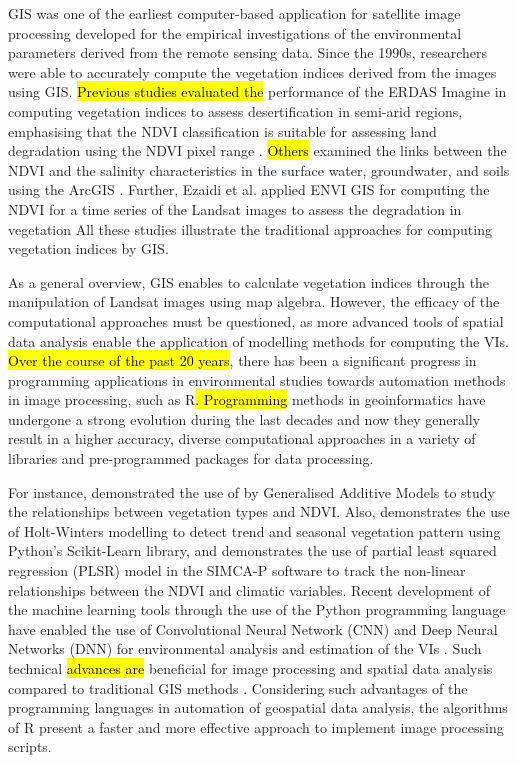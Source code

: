 \documentclass[jimaging,article,submit,pdftex,moreauthors]{Definitions/mdpi}
\begin{document}
GIS was one of the earliest computer-based application for satellite image processing developed for the empirical investigations of the environmental parameters derived from the remote sensing data. Since the 1990s, researchers were able to accurately compute the vegetation indices derived from the images using GIS. \hl{Previous studies evaluated the} performance of the ERDAS Imagine in computing vegetation indices to assess desertification in semi-arid regions, emphasising that the NDVI classification is suitable for assessing land degradation using the NDVI pixel range \cite{KUMAR2022100578}. \hl{Others} examined the links between the NDVI and the salinity characteristics in the surface water, groundwater, and soils using the ArcGIS \cite{RASHID2023100314}. Further, Ezaidi et al. applied ENVI GIS for computing the NDVI for a time series of the Landsat images to assess the degradation in vegetation \cite{EZAIDI2022100800} All these studies illustrate the traditional approaches for computing vegetation indices by GIS.

As a general overview, GIS enables to calculate vegetation indices through the manipulation of Landsat images using map algebra. However, the efficacy of the computational approaches must be questioned, as more advanced tools of spatial data analysis enable the application of modelling methods for computing the VIs. \hl{Over the course of the past 20 years}, there has been a significant progress in programming applications in environmental studies towards automation methods in image processing, such as R\hl{. Programming} methods in geoinformatics have undergone a strong evolution during the last decades and now they generally result in a higher accuracy, diverse computational approaches in a variety of libraries and pre-programmed packages for data processing. 

For instance, \cite{MARTINEZ2023115155} demonstrated the use of by Generalised Additive Models to study the relationships between vegetation types and NDVI. Also, \cite{OMAR2021e01020} demonstrates the use of Holt-Winters modelling to detect trend and seasonal vegetation pattern using Python's Scikit-Learn library, and \cite{WANG2022102704} demonstrates the use of partial least squared regression (PLSR) model in the SIMCA-P software to track the non-linear relationships between the NDVI and climatic variables. Recent development of the machine learning tools through the use of the Python programming language have enabled the use of Convolutional Neural Network (CNN) and Deep Neural Networks (DNN) for environmental analysis and estimation of the VIs \cite{BARRIGUINHA2022103069,ROY2021100582,LI2022102818,DAVIDSON2022107396}. Such technical \hl{advances are} beneficial for image processing and spatial data analysis compared to traditional GIS methods \cite{6049966,Lemenkova202301,6910592,Lemenkova202228,9323708,1027236}. Considering such advantages of the programming languages in automation of geospatial data analysis, the algorithms of R present a faster and more effective approach to implement image processing scripts.
\end{document}
